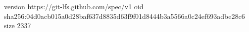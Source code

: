 version https://git-lfs.github.com/spec/v1
oid sha256:04d0acb015a0d28baf637d8835d63f9f01d8444b3a5566a0c24ef693adbe28c6
size 2337
